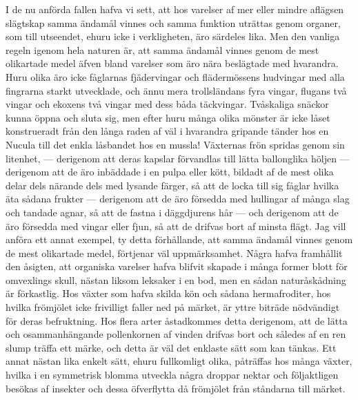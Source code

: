 I de nu anförda fallen hafva vi sett, att hos varelser af mer eller mindre aflägsen slägtskap samma ändamål vinnes och samma funktion uträttas genom organer, som till utseendet, ehuru icke i verkligheten, äro särdeles lika. Men den vanliga regeln igenom hela naturen är, att samma ändamål vinnes genom de mest olikartade medel äfven bland varelser som äro nära beslägtade med hvarandra. Huru olika äro icke fåglarnas fjädervingar och flädermössens hudvingar med alla fingrarna starkt utvecklade, och ännu mera trollsländans fyra vingar, flugans två vingar och ekoxens två vingar med dess båda täckvingar. Tvåskaliga snäckor kunna öppna och sluta sig, men efter huru många olika mönster är icke låset konstrueradt från den långa raden af väl i hvarandra gripande tänder hos en Nucula till det enkla låsbandet hos en mussla! Växternas frön spridas genom sin litenhet, — derigenom att deras kapslar förvandlas till lätta ballonglika höljen — derigenom att de äro inbäddade i en pulpa eller kött, bildadt af de mest olika delar dels närande dels med lysande färger, så att de locka till sig fåglar hvilka äta sådana frukter — derigenom att de äro försedda med hullingar af många slag och tandade agnar, så att de fastna i däggdjurens hår — och derigenom att de äro försedda med vingar eller fjun, så att de drifvas bort af minsta flägt. Jag vill anföra ett annat exempel, ty detta förhållande, att samma ändamål vinnes genom de mest olikartade medel, förtjenar väl uppmärksamhet. Några hafva framhållit den åsigten, att organiska varelser hafva blifvit skapade i många former blott för omvexlings skull, nästan liksom leksaker i en bod, men en sådan naturåskådning är förkastlig. Hos växter som hafva skilda kön och sådana hermafroditer, hos hvilka frömjölet icke frivilligt faller ned på märket, är yttre biträde nödvändigt för deras befruktning. Hos flera arter åstadkommes detta derigenom, att de lätta och osammanhängande pollenkornen af vinden drifvas bort och således af en ren slump träffa ett märke, och detta är väl det enklaste sätt som kan tänkas. Ett annat nästan lika enkelt sätt, ehuru fullkomligt olika, påträffas hos många växter, hvilka i en symmetrisk blomma utveckla några droppar nektar och följaktligen besökas af insekter och dessa öfverflytta då frömjölet från ståndarna till märket.

